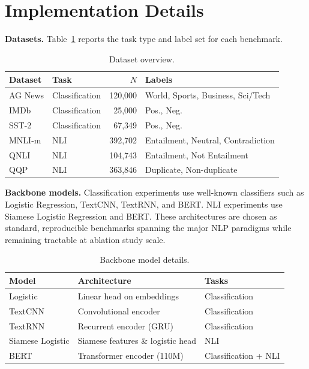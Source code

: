 \section{Implementation Details}
\label{app:expts}

\textbf{Datasets.}
Table~\ref{tab:datasets} reports the task type and label set for each benchmark.

\begin{table}[ht]
    \caption{Dataset overview.}
    \label{tab:datasets}
    \centering
    \begin{tabular}{llrl}
        \toprule
        \textbf{Dataset} & \textbf{Task} & $N$ & \textbf{Labels} \\
        \midrule
        AG News   & Classification & 120,000 & World, Sports, Business, Sci/Tech \\
        IMDb      & Classification &  25,000 & Pos., Neg. \\
        SST-2     & Classification &  67,349 & Pos., Neg. \\
        MNLI-m    & NLI            & 392,702 & Entailment, Neutral, Contradiction \\
        QNLI      & NLI            & 104,743 & Entailment, Not Entailment \\
        QQP       & NLI            & 363,846 & Duplicate, Non-duplicate \\
        \bottomrule
    \end{tabular}
\end{table}

\textbf{Backbone models.}
Classification experiments use well-known classifiers such as Logistic Regression, TextCNN, TextRNN, and BERT.
NLI experiments use Siamese Logistic Regression and BERT.
These architectures are chosen as standard, reproducible benchmarks spanning the major NLP paradigms while remaining tractable at ablation study scale.

\begin{table}[ht]
    \caption{Backbone model details.}
    \label{tab:backbones}
    \centering
    \begin{tabular}{lll}
        \toprule
        \textbf{Model}        & \textbf{Architecture}        & \textbf{Tasks} \\
        \midrule
        Logistic              & Linear head on embeddings    & Classification \\
        TextCNN               & Convolutional encoder        & Classification \\
        TextRNN               & Recurrent encoder (GRU)      & Classification \\
        Siamese Logistic      & Siamese features \& logistic head & NLI \\
        BERT & Transformer encoder (110M) & Classification + NLI \\
        \bottomrule
    \end{tabular}
\end{table}

